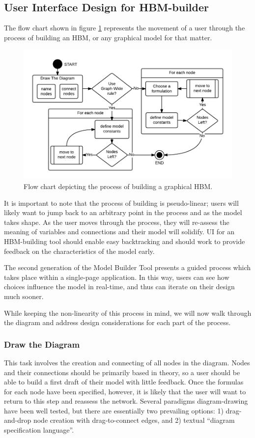 \documentclass[conference]{IEEEtran}
\begin{document}
\subsection{User Interface Design for HBM-builder }
The flow chart shown in figure \ref{HBM-build-process} represents the movement of a user through the process of building an HBM, or any graphical model for that matter.

\begin{figure}[!t]
  \centering
  \includegraphics[width=0.9\columnwidth]{img/HBM-build-process}
  \caption{Flow chart depicting the process of building a graphical HBM.}
  \label{HBM-build-process}
\end{figure}

It is important to note that the process of building is pseudo-linear; users will likely want to jump back to an arbitrary point in the process and as the model takes shape. 
As the user moves through the process, they will re-assess the meaning of variables and connections and their model will solidify. 
UI for an HBM-building tool should enable easy backtracking and should work to provide feedback on the characteristics of the model early. 

The second generation of the Model Builder Tool presents a guided process which takes place within a single-page application. 
In this way, users can see how choices influence the model in real-time, and thus can iterate on their design much sooner.

While keeping the non-linearity of this process in mind, we will now walk through the diagram and address design considerations for each part of the process.

\subsubsection{Draw the Diagram}
This task involves the creation and connecting of all nodes in the diagram. 
Nodes and their connections should be primarily based in theory, so a user should be able to build a first draft of their model with little feedback. 
Once the formulas for each node have been specified, however, it is likely that the user will want to return to this step and reassess the network. 
Several paradigms diagram-drawing have been well tested, but there are essentially two prevailing options:
1) drag-and-drop node creation with drag-to-connect edges, and 2) textual ``diagram specification language''.
\end{document}
